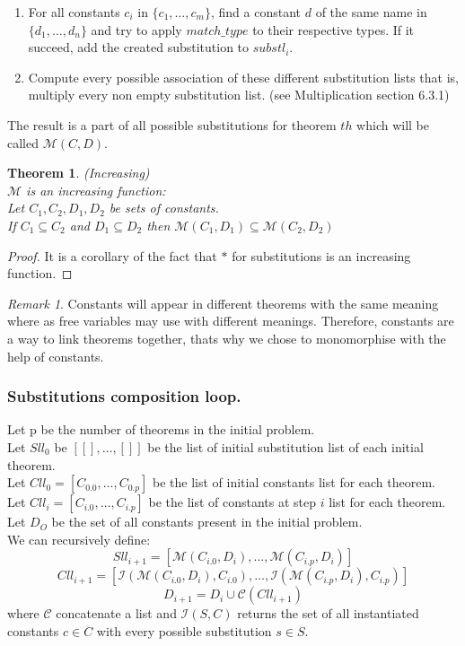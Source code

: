 \documentclass[a4paper, 11pt]{article}
\theoremstyle{plain}
\newtheorem*{thm}{Theorem}
\theoremstyle{definition}
\theoremstyle{remark}
\newtheorem*{remark}{Remark}
\begin{document}
\begin{enumerate}
\item For all constants $c_i$ in $\lbrace c_1,\ldots,c_m \rbrace$, find a constant $d$ of the same name in  $\lbrace d_1,\ldots,d_n \rbrace$ and try to apply $match\_type$ to their respective types. If it succeed, add the created substitution to $substl_i$. 
\item Compute every possible association of these different substitution lists that is, multiply every non empty substitution list. (see Multiplication section 6.3.1)
\end{enumerate}

The result is a part of all possible substitutions for theorem
$th$ which will be called $\mathcal{M}(C,D)$.
 
\begin{thm} (Increasing)
\\$\mathcal{M}$ is an increasing function:
\\Let $C_1,C_2,D_1,D_2$ be sets of constants.
\\If $C_1 \subseteq C_2$ and $D_1 \subseteq D_2$ then $\mathcal{M}(C_1,D_1) \subseteq \mathcal{M}(C_2,D_2)$
\end{thm}
 
\begin{proof} 
It is a corollary of the fact that $*$ for substitutions is an increasing function. 
\end{proof}

\begin{remark} Constants will appear in different theorems with the same meaning where as free variables may use with different meanings. Therefore, constants are a way to link theorems together, thats why we chose to monomorphise with the help of constants.
\end{remark} 
  
\subsubsection{Substitutions composition loop.}  
\noindent Let p be the number of theorems in the initial problem.
\\Let $Sll_0$ be $[[],\ldots,[]]$ be the list of initial substitution list of each initial theorem.  
\\Let $Cll_0 = [C_{0.0},\ldots,C_{0.p}]$ be the list of initial constants list for each theorem.
\\Let $Cll_i = [C_{i.0},\ldots,C_{i.p}]$ be the list of constants at step $i$ list for each theorem.
\\Let $D_O$ be the set of all constants present in the initial problem.
\\We can recursively define:
\[ Sll_{i+1} =  
[\mathcal{M}(C_{i.0},D_i),\ldots,\mathcal{M}(C_{i.p},D_i)] \]
\[ Cll_{i+1} = [\mathcal{I} (\mathcal{M} (C_{i.0},D_i),C_{i.0}),\ldots,\mathcal{I} (\mathcal{M} (C_{i.p},D_i),C_{i.p})]\] 
\[ D_{i+1} =  D_i \cup \mathcal{C} (Cll_{i+1})    \]
where $\mathcal{C}$ concatenate a list and $\mathcal{I}(S,C)$ returns the set of all instantiated constants $c \in C$ with every possible substitution $s \in S$.
\end{document}
